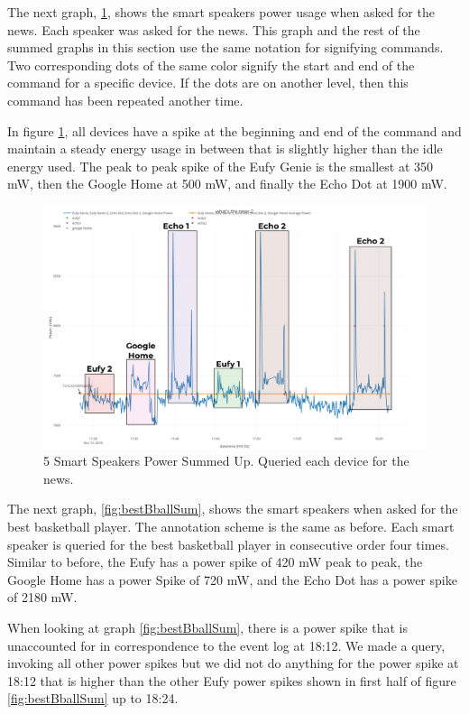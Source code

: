 The next graph, \ref{fig:mixedNewsSum}, shows the smart speakers power usage when asked for the news. Each speaker was asked for the news. This graph and the rest of the summed graphs in this section use the same notation for signifying commands. Two corresponding dots of the same color signify the start and end of the command for a specific device. If the dots are on another level, then this command has been repeated another time.

In figure \ref{fig:mixedNewsSum}, all devices have a spike at the beginning and end of the command and maintain a steady energy usage in between that is slightly higher than the idle energy used. The peak to peak spike of the Eufy Genie is the smallest at 350 mW, then the Google Home at 500 mW, and finally the Echo Dot at 1900 mW.

\begin{figure}[H]
  \centering
  \includegraphics[width=1\textwidth]{figures/mixedNewsSum.png}
  \caption{5 Smart Speakers Power Summed Up. Queried each device for the
  news.}
  \label{fig:mixedNewsSum}
\end{figure}

The next graph, \ref{fig:bestBballSum}, shows the smart speakers when asked for the best basketball player. The annotation scheme is the same as before. Each smart speaker is queried for the best basketball player in consecutive order four times. Similar to before, the Eufy has a power spike of 420 mW peak to peak, the Google Home has a power Spike of 720 mW, and the Echo Dot has a power spike of 2180 mW.

When looking at graph \ref{fig:bestBballSum}, there is a power spike that is unaccounted for in correspondence to the event log at 18:12. We made a query, invoking all other power spikes but we did not do anything for the power spike at 18:12 that is higher than the other Eufy power spikes shown in first half of figure \ref{fig:bestBballSum} up to 18:24.

